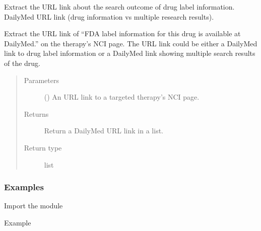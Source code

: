 \documentclass[letterpaper,10pt,english]{sphinxmanual}
\begin{document}

\begin{fulllineitems}
\label{\detokenize{biomarker_extraction:biomarker_extraction.drug_search_url}}
\sphinxAtStartPar
Extract the URL link about the search outcome of drug label information. DailyMed URL link (drug information vs multiple research results).

\sphinxAtStartPar
Extract the URL link of “FDA label information for this drug is available at DailyMed.” on the therapy’s NCI page. The URL link could be either a DailyMed link to drug label information or a DailyMed link showing multiple search results of the drug.
\begin{quote}\begin{description}
\item[{Parameters}] \leavevmode
\sphinxAtStartPar
{} () \textendash{} An URL link to a targeted therapy’s NCI page.

\item[{Returns}] \leavevmode
\sphinxAtStartPar
Return a DailyMed URL link in a list.

\item[{Return type}] \leavevmode
\sphinxAtStartPar
list

\end{description}\end{quote}
\subsubsection*{Examples}

\sphinxAtStartPar
Import the module

\begin{sphinxVerbatim}[commandchars=\\\{\}]
   
\end{sphinxVerbatim}

\sphinxAtStartPar
Example


\end{fulllineitems}
\end{document}
